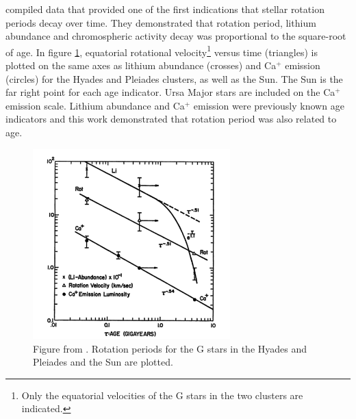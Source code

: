 \citet{Skumanich1972} compiled data that provided one of the first indications
that stellar rotation periods decay over time.
They demonstrated that rotation period, lithium abundance and chromospheric
activity decay was proportional to the square-root of age.
In figure \ref{fig:skumanich}, equatorial rotational velocity\footnote{ Only
the equatorial velocities of the G stars in the two clusters are indicated.}
versus time (triangles) is plotted on the same axes as lithium abundance
(crosses) and Ca$^+$ emission (circles) for the Hyades and Pleiades clusters,
as well as the Sun.
The Sun is the far right point for each age indicator.
Ursa Major stars are included on the Ca$^+$ emission scale.
Lithium abundance and Ca$^+$ emission were previously known age indicators and
this work demonstrated that rotation period was also related to age.
\begin{figure}
\begin{center}
\includegraphics[width=3in, clip=true]{figures/skumanich.pdf}
\caption[\citet{skumanich1972} results: early evidence for magnetic braking]
{Figure from \citet{skumanich1972}. Rotation periods for the G stars in the
Hyades and Pleiades and the Sun are plotted.}
\label{fig:skumanich}
\end{center}
\end{figure}


